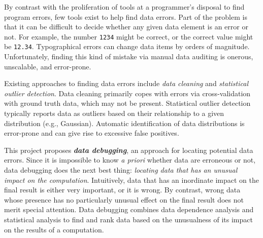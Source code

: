 


By contrast with the proliferation of tools at a programmer's disposal
to find program errors, few tools exist to help find data errors. Part
of the problem is that it can be difficult to decide whether any given
data element is an error or not. For example, the number \texttt{1234}
might be correct, or the correct value might
be \texttt{12.34}. Typographical errors can change data items by
orders of magnitude. Unfortunately, finding this kind of mistake via
manual data auditing is onerous, unscalable, and error-prone.




Existing approaches to finding data errors include
\emph{data cleaning} and  \emph{statistical outlier detection}.
Data cleaning primarily copes with errors via
cross-validation with ground truth data, which may not be
present. Statistical outlier detection typically reports data as
outliers based on their relationship to a given distribution (e.g.,
Gaussian).  Automatic identification of data distributions is
error-prone and can give rise to excessive false positives.



This project proposes \emph{\bf data debugging}, an approach for locating
potential data errors. Since it is impossible to know \emph{a priori}
whether data are erroneous or not, data debugging does the next best
thing: \emph{locating data that has an unusual
impact on the computation}. Intuitively, data that has an inordinate impact on the final
result is either very important, or it is wrong. By contrast, wrong
data whose presence has no particularly unusual effect on the final result does not
merit special attention.  Data debugging combines data dependence
analysis and statistical analysis to find and rank data based on the unusualness of its
impact on the results of a computation.

